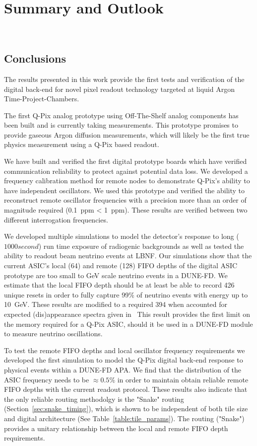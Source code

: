 \chapter{Summary and Outlook}~\label{chap:summary}

\section{Conclusions}

The results presented in this work provide the first tests and verification of the digital back-end for novel pixel readout technology targeted at liquid Argon Time-Project-Chambers.

The first Q-Pix analog prototype using Off-The-Shelf analog components has been built and is currently taking measurements.
This prototype promises to provide gaseous Argon diffusion measurements, which will likely be the first true physics measurement using a Q-Pix based readout.

We have built and verified the first digital prototype boards which have verified communication reliability to protect against potential data loss.
We developed a frequency calibration method for remote nodes to demonstrate Q-Pix's ability to have independent oscillators.
We used this prototype and verified the ability to reconstruct remote oscillator frequencies with a precision more than an order of magnitude required (0.1~\unit{ppm} < 1~\unit{ppm}).
These results are verified between two different interrogation frequencies.

We developed multiple simulations to model the detector's response to long ($1000 second$) run time exposure of radiogenic backgrounds as well as tested the ability to readout beam neutrino events at LBNF.
Our simulations show that the current ASIC's local (64) and remote (128) FIFO depths of the digital ASIC prototype are too small to \unit{GeV} scale neutrino events in a DUNE-FD.
We estimate that the local FIFO depth should be at least be able to record 426 unique resets in order to fully capture 99\% of neutrino events with energy up to 10~\unit{GeV}.
These results are modified to a required 394 when accounted for expected (dis)appearance spectra given in~\citep{DUNE_FD_TDRv2_2020}
This result provides the first limit on the memory required for a Q-Pix ASIC, should it be used in a DUNE-FD module to measure neutrino oscillations.

To test the remote FIFO depths and local oscillator frequency requirements we developed the first simulation to model the Q-Pix digital back-end response to physical events within a DUNE-FD APA.
We find that the distribution of the ASIC frequency needs to be $\approx 0.5\%$ in order to maintain obtain reliable remote FIFO depths with the current readout protocol. 
These results also indicate that the only reliable routing methodolgy is the "Snake" routing (Section~\ref{sec:snake_timing}), which is shown to be independent of both tile size and digital architecture (See Table~\ref{table:tile_params}).
The routing ("Snake") provides a unitary relationship between the local and remote FIFO depth requirements.

